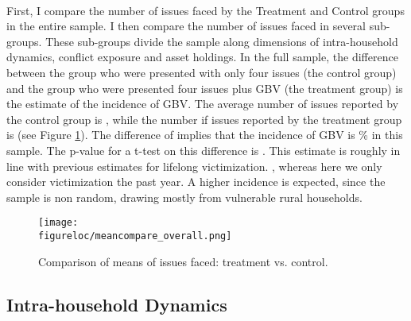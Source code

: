 \documentclass[11pt,a4paper]{scrartcl} %
\newcommand{\figureloc}{C:/Users/Koen/Dropbox/PhD/Papers/CongoGBV/Figures}
\begin{document}
\paragraph{}
First, I compare the number of issues faced by the Treatment and Control groups in the entire sample. I then compare the number of issues faced in several sub-groups. These sub-groups divide the sample along dimensions of intra-household dynamics, conflict exposure and asset holdings. In the full sample, the difference between the group who were presented with only four issues (the control group) and the group who were presented four issues plus GBV (the treatment group) is the estimate of the incidence of GBV. The average number of issues reported by the control group is , while the number if issues reported by the treatment group is  (see Figure \ref{fig:meancompare_overall}). The difference of  implies that the incidence of GBV is \% in this sample. The p-value for a t-test on this difference is . This estimate is roughly in line with previous estimates for lifelong victimization.
 \citep{Peterson2018,Stark2017,Johnson2010}, whereas here we only consider victimization the past year. A higher incidence is expected, since the sample is non random, drawing mostly from vulnerable rural households. 


\begin{figure}[H]
  \texttt{[image: \\figureloc/meancompare\_overall.png]}
  \caption{Comparison of means of issues faced: treatment vs. control.}
  \label{fig:meancompare_overall}
\end{figure}

\subsection*{Intra-household Dynamics}
\end{document}
